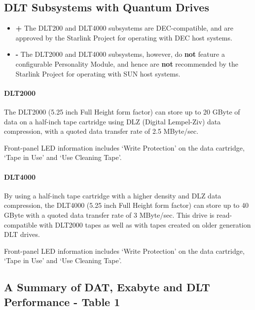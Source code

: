 \documentclass[11pt]{article}
\begin{document}
\subsection {DLT Subsystems with Quantum Drives}

\begin {itemize}

\item[{\Large\bf +}] The DLT200 and DLT4000 subsystems are DEC-compatible, and
are approved by the Starlink Project for operating with DEC host systems.

\item[{\huge\bf -}] The DLT2000 and DLT4000 subsystems, however, do {\bf not}
feature a configurable Personality Module, and hence are {\bf not} recommended
by the Starlink Project for operating with SUN host systems.

\end {itemize}

\paragraph {DLT2000}

The DLT2000 (5.25 inch Full Height form factor) can store up to 20 GByte of
data on a half-inch tape cartridge using DLZ (Digital Lempel-Ziv) data
compression, with a quoted data transfer rate of 2.5 MByte/sec.

Front-panel LED information includes `Write Protection' on the data cartridge,
`Tape in Use' and `Use Cleaning Tape'.

\paragraph {DLT4000}

By using a half-inch tape cartridge with a higher density and DLZ data
compression, the DLT4000 (5.25 inch Full Height form factor) can store up to
40 GByte with a quoted data transfer rate of 3 MByte/sec. This drive is
read-compatible with DLT2000 tapes as well as with tapes created on older
generation DLT drives.

Front-panel LED information includes `Write Protection' on the data cartridge,
`Tape in Use' and `Use Cleaning Tape'.

\subsection {A Summary of DAT, Exabyte and DLT Performance - Table 1}
\end{document}
